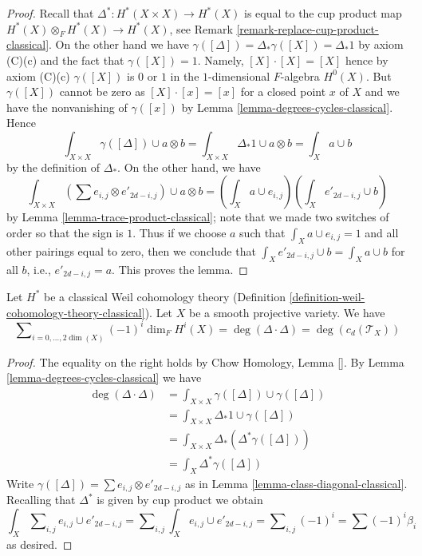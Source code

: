 \begin{proof}
Recall that $\Delta^* : H^*(X \times X) \to H^*(X)$ is equal to the
cup product map $H^*(X) \otimes_F H^*(X) \to H^*(X)$, see
Remark \ref{remark-replace-cup-product-classical}. On the other hand we have
$\gamma([\Delta]) = \Delta_*\gamma([X]) = \Delta_*1$ by
axiom (C)(c) and the fact that $\gamma([X]) = 1$. Namely,
$[X] \cdot [X] = [X]$ hence by axiom (C)(c) $\gamma([X])$ is $0$ or $1$ in
the $1$-dimensional $F$-algebra $H^0(X)$. But $\gamma([X])$
cannot be zero as $[X] \cdot [x] = [x]$ for a closed point $x$ of $X$
and we have the nonvanishing of $\gamma([x])$ by
Lemma \ref{lemma-degrees-cycles-classical}.
Hence
$$
\int_{X \times X} \gamma([\Delta]) \cup a \otimes b =
\int_{X \times X} \Delta_*1 \cup a \otimes b =
\int_X a \cup b
$$
by the definition of $\Delta_*$. On the other hand, we have
$$
\int_{X \times X} (\sum e_{i, j} \otimes e'_{2d -i , j}) \cup a \otimes b =
(\int_X a \cup e_{i, j})(\int_X e'_{2d - i, j} \cup b)
$$
by Lemma \ref{lemma-trace-product-classical}; note that we made
two switches of order so that the sign is $1$.
Thus if we choose $a$ such that $\int_X a \cup e_{i, j} = 1$
and all other pairings equal to zero, then we conclude that
$\int_X e'_{2d - i, j} \cup b = \int_X a \cup b$ for all $b$, i.e.,
$e'_{2d - i, j} = a$. This proves the lemma.
\end{proof}

\begin{lemma}
\label{lemma-square-diagonal-classical}
Let $H^*$ be a classical Weil cohomology theory
(Definition \ref{definition-weil-cohomology-theory-classical}).
Let $X$ be a smooth projective variety. We have
$$
\sum\nolimits_{i = 0, \ldots, 2\dim(X)} (-1)^i\dim_F H^i(X) =
\deg(\Delta \cdot \Delta) = \deg(c_d(\mathcal{T}_X))
$$
\end{lemma}

\begin{proof}
The equality on the right holds by Chow Homology, Lemma \ref{}.
By Lemma \ref{lemma-degrees-cycles-classical} we have
\begin{align*}
\deg(\Delta \cdot \Delta)
& =
\int_{X \times X} \gamma([\Delta]) \cup \gamma([\Delta]) \\
& =
\int_{X \times X} \Delta_*1 \cup \gamma([\Delta]) \\
& =
\int_{X \times X} \Delta_*(\Delta^*\gamma([\Delta])) \\
& =
\int_X \Delta^*\gamma([\Delta])
\end{align*}
Write $\gamma([\Delta]) = \sum  e_{i, j} \otimes e'_{2d - i , j}$
as in Lemma \ref{lemma-class-diagonal-classical}.
Recalling that $\Delta^*$ is given by cup product we obtain
$$
\int_X \sum\nolimits_{i, j} e_{i, j} \cup e'_{2d - i, j} =
\sum\nolimits_{i, j} \int_X e_{i, j} \cup e'_{2d - i, j} =
\sum\nolimits_{i, j} (-1)^i = \sum (-1)^i\beta_i
$$
as desired.
\end{proof}




